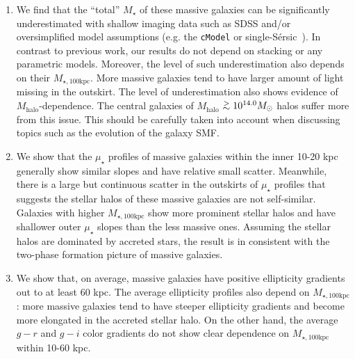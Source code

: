 \documentclass[a4paper,fleqn,usenatbib]{mnras}
\def\simgt{\lower.5ex\hbox{$\; \buildrel > \over {\sim} \;$}}
\def\ser{{S\'{e}rsic\ }}
\def\mstar{{$M_{\star}$}}
\def\mhalo{{$M_{\mathrm{halo}}$}}
\def\mtot{{$M_{\star,100\mathrm{kpc}}$}}
\def\mden{{$\mu_{\star}$}}
\begin{document}
    \begin{enumerate}
        \item We find that the ``total'' \mstar{} of these massive galaxies can be 
            significantly underestimated with shallow imaging data such as SDSS and/or 
            oversimplified model assumptions (e.g. the \texttt{cModel} or single-\ser{}). 
            In contrast to previous work, our results do not depend on stacking or any 
            parametric models. 
            Moreover, the level of such underestimation also depends on their \mtot{}.
            More massive galaxies tend to have larger amount of light missing in the 
            outskirt.  
            The level of underestimation also shows evidence of \mhalo{}-dependence. 
            The central galaxies of \mhalo{}$\simgt 10^{14.0} M_{\odot}$ halos suffer
            more from this issue. 
            This should be carefully taken into account when discussing topics such 
            as the evolution of the galaxy SMF.
            
        \item We show that the \mden{} profiles of massive galaxies within the inner 
            10-20 kpc generally show similar slopes and have relative small scatter. 
            Meanwhile, there is a large but continuous scatter in the outskirts of 
            \mden{} profiles that suggests the stellar halos of these massive galaxies 
            are not self-similar. 
            Galaxies with higher \mtot{} show more prominent stellar halos and have 
            shallower outer \mden{} slopes than the less massive ones. 
            Assuming the stellar halos are dominated by accreted stars, the result is 
            in consistent with the two-phase formation picture of massive galaxies.  
        
        \item We show that, on average, massive galaxies have positive ellipticity 
            gradients out to at least 60 kpc. 
            The average ellipticity profiles also depend on \mtot{}: more massive 
            galaxies tend to have steeper ellipticity gradients and become more 
            elongated in the accreted stellar halo. 
            On the other hand, the average $g-r$ and $g-i$ color gradients do not 
            show clear dependence on \mtot{} within 10-60 kpc. 
            
    \end{enumerate}
\end{document}
